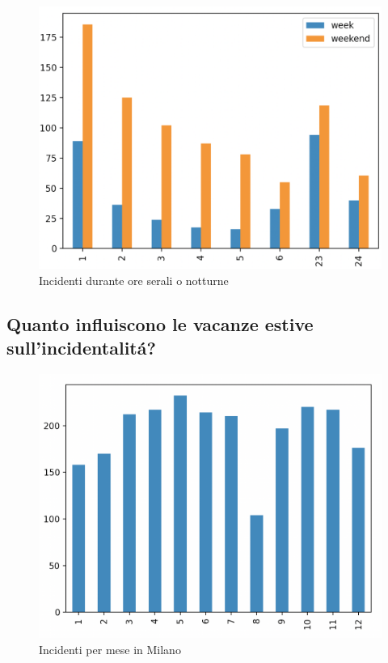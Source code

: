 \documentclass[a4paper]{report}
\begin{document}
\begin{figure}[!ht]
    \includegraphics[width=\linewidth]{../src/incidenti/incidenti_senza_coords/ore_punta/ore_notte.png}
    \caption{Incidenti durante ore serali o notturne}
    \label{fig:ore_notte}
\end{figure}


\clearpage
\subsection{Quanto influiscono le vacanze estive sull'incidentalit\'a?}

\begin{figure}[!ht]
    \includegraphics[width=\linewidth]{../src/incidenti/incidenti_senza_coords/mese_incidenti/milano_mese.png}
    \caption{Incidenti per mese in Milano}
    \label{fig:milano_mese}
\end{figure}
\end{document}
